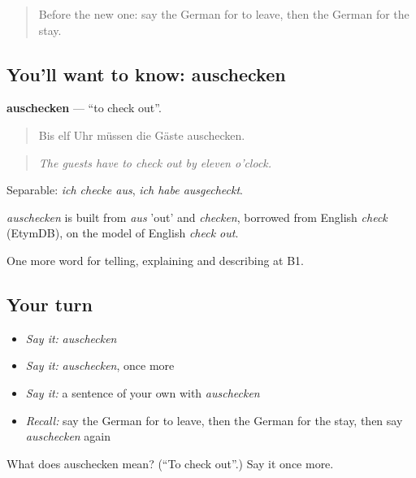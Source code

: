 \label{lesson:GE-C426-auschecken}



\begin{quote}
Before the new one: say the German for to leave, then the German for the stay.
\end{quote}

\subsection*{You'll want to know: auschecken}
\textbf{auschecken} — \textquotedblleft{}to check out\textquotedblright{}.

\begin{quote}
Bis elf Uhr müssen die Gäste auschecken.
\end{quote}

\begin{quote}
\emph{The guests have to check out by eleven o'clock.}
\end{quote}

Separable: \emph{ich checke aus}, \emph{ich habe ausgecheckt}.

\begin{cousinweb}
\emph{auschecken} is built from \emph{aus} 'out' and \emph{checken}, borrowed from English \emph{check} (EtymDB), on the model of English \emph{check out}.
\end{cousinweb}

\begin{grammarlens}[title={What you've built}]
One more word for telling, explaining and describing at B1.
\end{grammarlens}

\subsection*{Your turn}
\begin{itemize}
\raggedright
  \item \emph{Say it:} \emph{auschecken}
  \item \emph{Say it:} \emph{auschecken}, once more
  \item \emph{Say it:} a sentence of your own with \emph{auschecken}
  \item \emph{Recall:} say the German for to leave, then the German for the stay, then say \emph{auschecken} again
\end{itemize}

\begin{tcolorbox}[breakable,colback=teal!4,colframe=teal!35!black,title={Before you move on}]
What does auschecken mean? (\textquotedblleft{}To check out\textquotedblright{}.) Say it once more.
\end{tcolorbox}
